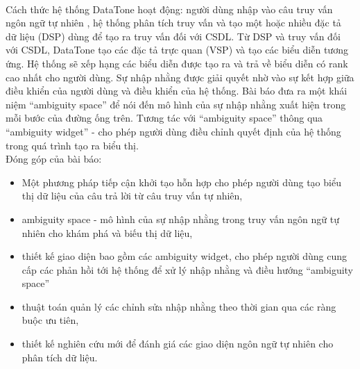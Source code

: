 \documentclass[12pt]{report}
\begin{document}
\paragraph*{}
Cách thức hệ thống DataTone hoạt động: người dùng nhập vào câu truy vấn ngôn ngữ tự nhiên , hệ thống phân tích truy vấn và tạo một hoặc nhiều đặc tả dữ liệu (DSP) dùng để tạo ra truy vấn đối với CSDL. Từ DSP và truy vấn đối với CSDL, DataTone tạo các đặc tả trực quan (VSP) và tạo các biểu diễn tương ứng. Hệ thống sẽ xếp hạng các biểu diễn được tạo ra và trả về biểu diễn có rank cao nhất cho người dùng. Sự nhập nhằng được giải quyết nhờ vào sự kết hợp giữa điều khiển của người dùng và điều khiển của hệ thống. Bài báo đưa ra một khái niệm “ambiguity space” để nói đến mô hình của sự nhập nhằng xuất hiện trong mỗi bước của đường ống trên. Tương tác với “ambiguity space” thông qua “ambiguity widget” - cho phép người dùng điều chỉnh quyết định của hệ thống trong quá trình tạo ra biểu thị. \\
Đóng góp của bài báo:
\begin{itemize}
	\item Một phương pháp tiếp cận khởi tạo hỗn hợp cho phép người dùng tạo biểu thị dữ liệu của câu trả lời từ câu truy vấn tự nhiên,	\item ambiguity space - mô hình của sự nhập nhằng trong truy vấn ngôn ngữ tự nhiên cho khám phá và biếu thị dữ liệu,
	\item thiết kế giao diện bao gồm các ambiguity widget, cho phép người dùng cung cấp các phản hồi tới hệ thống để xử lý nhập nhằng và điều hướng “ambiguity space”
	\item thuật toán quản lý các chỉnh sửa nhập nhằng theo thời gian qua các ràng buộc ưu tiên,
	\item thiết kế nghiên cứu mới để đánh giá các giao diện ngôn ngữ tự nhiên cho phân tích dữ liệu.
\end{itemize}
\end{document}

